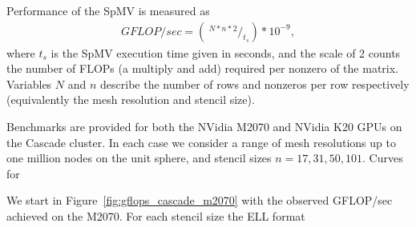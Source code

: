 \documentclass{report}
\begin{document}
Performance of the SpMV is measured as
\begin{align}
GFLOP/sec = (\ ^{N * n * 2} /_{t_{s}} ) * 10^{-9},
\end{align}
where $t_{s}$ is the SpMV execution time given in seconds, and the scale of 2 counts the number of FLOPs (a multiply and add) required per nonzero of the matrix. Variables $N$ and $n$ describe the number of rows and nonzeros per row respectively (equivalently the mesh resolution and stencil size).

Benchmarks are provided for both the NVidia M2070 and NVidia K20 GPUs on the Cascade cluster. In each case we consider a range of mesh resolutions up to one million nodes on the unit sphere, and stencil sizes $n=17, 31, 50, 101$. Curves for 

We start in Figure~\ref{fig:gflops_cascade_m2070} with the observed GFLOP/sec achieved on the M2070. For each stencil size the ELL format 
\end{document}
